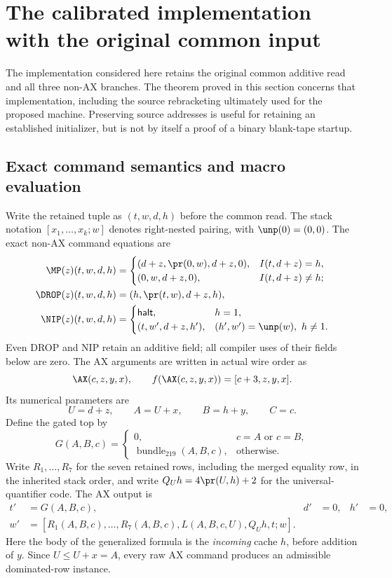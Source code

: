 \section{The calibrated implementation with the original common input}
\label{sec:dominated-common-input}

The implementation considered here retains the original common additive
read and all three non-AX branches.  The theorem proved in this section concerns
that implementation, including the source rebracketing ultimately used
for the proposed machine.  Preserving source addresses is useful for
retaining an established initializer, but is not by itself a proof of a
binary blank-tape startup.

\subsection{Exact command semantics and macro evaluation}

Write the retained tuple as $(t,w,d,h)$ before the common read.  The
stack notation $[x_1,\ldots,x_k;w]$ denotes right-nested pairing,
with $\unp(0)=(0,0)$.  The exact non-AX command equations are
\begin{align*}
 \MP(z)(t,w,d,h)&=
 \begin{cases}
 (d+z,\pr(0,w),d+z,0),&I(t,d+z)=h,\\
 (0,w,d+z,0),&I(t,d+z)\ne h;
 \end{cases}\\
 \DROP(z)(t,w,d,h)&=(h,\pr(t,w),d+z,h),\\
 \NIP(z)(t,w,d,h)&=
 \begin{cases}
 \mathsf{halt},&h=1,\\
 (t,w',d+z,h'),&(h',w')=\unp(w),\ h\ne1.
 \end{cases}
\end{align*}
Even DROP and NIP retain an additive field; all compiler uses of their
fields below are zero.
The AX arguments are written in actual wire order as
\[
 \AX(c,z,y,x),\qquad
 f(\AX(c,z,y,x))=[c+3,z,y,x].
\]
Its numerical parameters are
\[
 U=d+z,\qquad A=U+x,\qquad B=h+y,\qquad C=c.
\]
Define the gated top by
\[
 G(A,B,c)=\begin{cases}
 0,&c=A\text{ or }c=B,\\
 \operatorname{bundle}_{219}(A,B,c),&\text{otherwise}.
 \end{cases}
\]
Write $R_1,\ldots,R_7$ for the seven retained rows, including the merged
equality row, in the inherited stack order, and write
$Q_Uh=4\pr(U,h)+2$ for the universal-quantifier code.  The AX output is
\begin{align*}
 t'&=G(A,B,c),&d'&=0,&h'&=0,\\
 w'&=[R_1(A,B,c),\ldots,R_7(A,B,c),L(A,B,c,U),Q_Uh,t;w].
\end{align*}
Here the body of the generalized formula is the \emph{incoming} cache
$h$, before addition of $y$.  Since $U\leq U+x=A$, every raw AX command
produces an admissible dominated-row instance.

